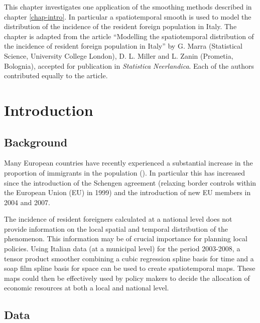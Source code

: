 \label{chap-it}

This chapter investigates one application of the smoothing methods described in chapter \ref{chap-intro}. In particular a spatiotemporal smooth is used to model the distribution of the incidence of the resident foreign population in Italy. The chapter is adapted from the article ``Modelling the spatiotemporal distribution of the incidence of resident foreign population in Italy'' by G. Marra (Statistical Science, University College London), D. L. Miller and L. Zanin (Prometia, Bolognia), accepted for publication in \textit{Statistica Neerlandica}. Each of the authors contributed equally to the article.

\section{Introduction \label{IN}}

\subsection{Background}

Many European countries have recently experienced a substantial increase in the proportion of immigrants in the population (\cite{Manning2010}). In particular this has increased since the introduction of the Schengen agreement (relaxing border controls within the European Union (EU) in 1999) and the introduction of new EU members in 2004 and 2007. 

The incidence of resident foreigners calculated at a national level does not provide information on the local spatial and temporal distribution of the phenomenon. This information may be of crucial importance for planning local policies. Using Italian data (at a municipal level) for the period 2003-2008, a tensor product smoother combining a cubic regression spline basis for time and a soap film spline basis for space can be used to create spatiotemporal maps. These maps could then be effectively used by policy makers to decide the allocation of economic resources at both a local and national level.

\subsection{Data}  

